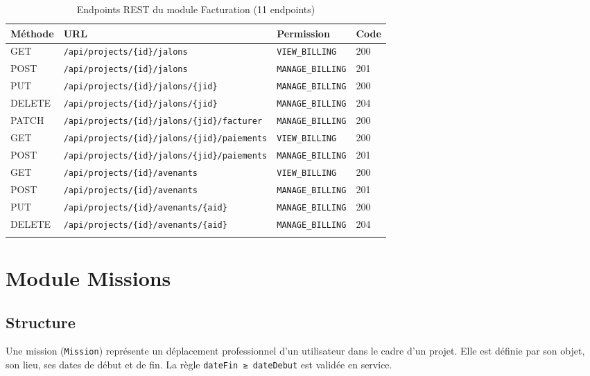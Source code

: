 \begin{longtable}{|m{1.8cm}|m{7.5cm}|m{3cm}|m{1.5cm}|}
\hline
\textbf{Méthode} & \textbf{URL} & \textbf{Permission} & \textbf{Code} \\
\hline
\endhead
\endfoot
\endlastfoot
\hline
GET & \texttt{/api/projects/\{id\}/jalons} & \texttt{VIEW\_BILLING} & 200 \\
\hline
POST & \texttt{/api/projects/\{id\}/jalons} & \texttt{MANAGE\_BILLING} & 201 \\
\hline
PUT & \texttt{/api/projects/\{id\}/jalons/\{jid\}} & \texttt{MANAGE\_BILLING} & 200 \\
\hline
DELETE & \texttt{/api/projects/\{id\}/jalons/\{jid\}} & \texttt{MANAGE\_BILLING} & 204 \\
\hline
PATCH & \texttt{/api/projects/\{id\}/jalons/\{jid\}/facturer} & \texttt{MANAGE\_BILLING} & 200 \\
\hline
GET & \texttt{/api/projects/\{id\}/jalons/\{jid\}/paiements} & \texttt{VIEW\_BILLING} & 200 \\
\hline
POST & \texttt{/api/projects/\{id\}/jalons/\{jid\}/paiements} & \texttt{MANAGE\_BILLING} & 201 \\
\hline
GET & \texttt{/api/projects/\{id\}/avenants} & \texttt{VIEW\_BILLING} & 200 \\
\hline
POST & \texttt{/api/projects/\{id\}/avenants} & \texttt{MANAGE\_BILLING} & 201 \\
\hline
PUT & \texttt{/api/projects/\{id\}/avenants/\{aid\}} & \texttt{MANAGE\_BILLING} & 200 \\
\hline
DELETE & \texttt{/api/projects/\{id\}/avenants/\{aid\}} & \texttt{MANAGE\_BILLING} & 204 \\
\hline
\caption{Endpoints REST du module Facturation (11 endpoints)}
\label{tab:billing-api}
\end{longtable}

\section{Module Missions}

\subsection{Structure}

Une mission (\texttt{Mission}) représente un déplacement professionnel d'un utilisateur dans le
cadre d'un projet. Elle est définie par son objet, son lieu, ses dates de début et de fin. La règle
\texttt{dateFin ≥ dateDebut} est validée en service.


